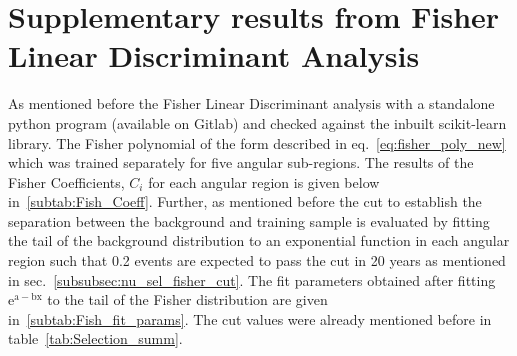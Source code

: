 \chapter{Supplementary results from Fisher Linear Discriminant Analysis}
\label{sec:app_4}

As mentioned before the Fisher Linear Discriminant analysis with a standalone python program (available on Gitlab) and checked against the inbuilt scikit-learn library. The Fisher polynomial of the form described in eq.~\ref{eq:fisher_poly_new} which was trained separately for five angular sub-regions. The results of the Fisher Coefficients, $C_i$ for each angular region is given below in~\ref{subtab:Fish_Coeff}. 
Further, as mentioned before the cut to establish the separation between the background and training sample is evaluated by fitting the tail of the background distribution to an exponential function in each angular region such that 0.2 events are expected to pass the cut in 20 years as mentioned in sec.~\ref{subsubsec:nu_sel_fisher_cut}. The fit parameters obtained after fitting $\mathrm{e^{a-bx}}$ to the tail of the Fisher distribution are given in~\ref{subtab:Fish_fit_params}. The cut values were already mentioned before in table~\ref{tab:Selection_summ}.


